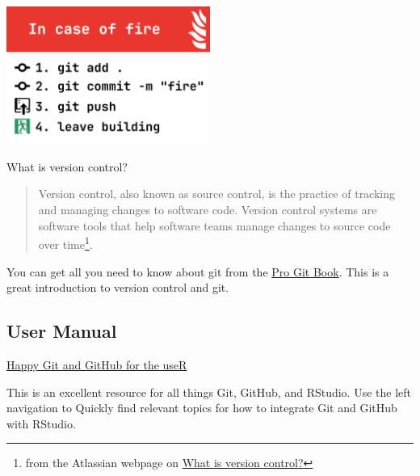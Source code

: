 \documentclass[
  letterpaper,
  DIV=11,
  numbers=noendperiod]{scrreprt}
\begin{document}
\begin{center}
\includegraphics[width=0.5\textwidth,height=\textheight]{assets/in_case_of_fire2.png}
\end{center}

What is version control?

\begin{quote}
Version control, also known as source control, is the practice of
tracking and managing changes to software code. Version control systems
are software tools that help software teams manage changes to source
code over time\footnote{from the Atlassian webpage on
  \href{https://www.atlassian.com/git/tutorials/what-is-version-control}{What
  is version control?}}.
\end{quote}

You can get all you need to know about git from the
\href{https://git-scm.com/book/en/v2}{Pro Git Book}. This is a great
introduction to version control and git.

\subsection{User Manual}\label{user-manual}

\href{https://happygitwithr.com/}{Happy Git and GitHub for the useR}

This is an excellent resource for all things Git, GitHub, and RStudio.
Use the left navigation to Quickly find relevant topics for how to
integrate Git and GitHub with RStudio.
\end{document}
